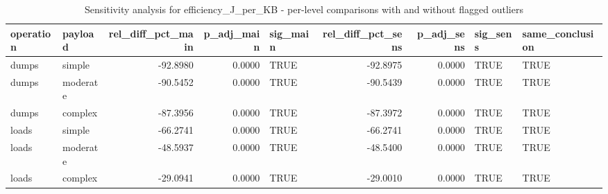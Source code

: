 \begin{table}[ht]
\centering
\begin{tabular}{llrrlrrll}
  \toprule
operation & payload & rel\_diff\_pct\_main & p\_adj\_main & sig\_main & rel\_diff\_pct\_sens & p\_adj\_sens & sig\_sens & same\_conclusion \\ 
  \midrule
dumps & simple & -92.8980 & 0.0000 & TRUE & -92.8975 & 0.0000 & TRUE & TRUE \\ 
  dumps & moderate & -90.5452 & 0.0000 & TRUE & -90.5439 & 0.0000 & TRUE & TRUE \\ 
  dumps & complex & -87.3956 & 0.0000 & TRUE & -87.3972 & 0.0000 & TRUE & TRUE \\ 
  loads & simple & -66.2741 & 0.0000 & TRUE & -66.2741 & 0.0000 & TRUE & TRUE \\ 
  loads & moderate & -48.5937 & 0.0000 & TRUE & -48.5400 & 0.0000 & TRUE & TRUE \\ 
  loads & complex & -29.0941 & 0.0000 & TRUE & -29.0010 & 0.0000 & TRUE & TRUE \\ 
   \bottomrule
\end{tabular}
\caption{Sensitivity analysis for efficiency_J_per_KB - per-level comparisons with and without flagged outliers} 
\label{tab:sens_RQ1_1_efficiency_pairwise}
\end{table}
